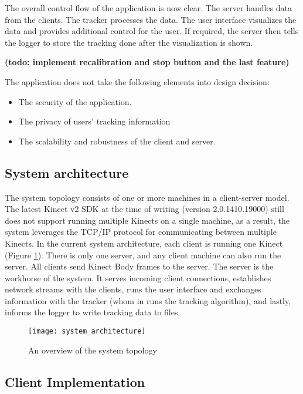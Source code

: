 The overall control flow of the application is now clear. The server handles data from the clients. The tracker processes the data. The user interface visualizes the data and provides additional control for the user. If required, the server then tells the logger to store the tracking done after the visualization is shown.

\textbf{(todo: implement recalibration and stop button and the last feature)}

The application does not take the following elements into design decision:

\begin{itemize}
  \item The security of the application.
  \item The privacy of users' tracking information
  \item The scalability and robustness of the client and server.
\end{itemize}

\subsection{System architecture}

The system topology consists of one or more machines in a client-server model. The latest Kinect v2 SDK at the time of writing (version 2.0.1410.19000) still does not support running multiple Kinects on a single machine, as a result, the system leverages the TCP/IP protocol for communicating between multiple Kinects. In the current system architecture, each client is running one Kinect (Figure \ref{fig:system_architecture}). There is only one server, and any client machine can also run the server. All clients send Kinect Body frames to the server. The server is the workhorse of the system. It serves incoming client connections, establishes network streams with the clients, runs the user interface and exchanges information with the tracker (whom in runs the tracking algorithm), and lastly, informs the logger to write tracking data to files.

\begin{figure}[!htb]
  \centering
  \texttt{[image: system\_architecture]}
  \caption{An overview of the system topology}
  \label{fig:system_architecture}
\end{figure}

\subsection{Client Implementation}

